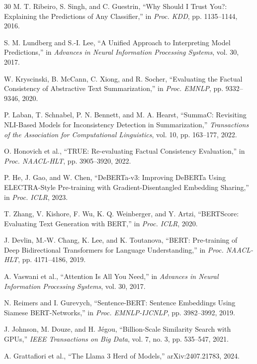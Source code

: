 \documentclass[conference]{IEEEtran}
\begin{document}
\begin{thebibliography}{30}
M. T. Ribeiro, S. Singh, and C. Guestrin, ``Why Should I Trust You?: Explaining the Predictions of Any Classifier,'' in \emph{Proc. KDD}, pp. 1135--1144, 2016.

S. M. Lundberg and S.-I. Lee, ``A Unified Approach to Interpreting Model Predictions,'' in \emph{Advances in Neural Information Processing Systems}, vol. 30, 2017.

W. Kryscinski, B. McCann, C. Xiong, and R. Socher, ``Evaluating the Factual Consistency of Abstractive Text Summarization,'' in \emph{Proc. EMNLP}, pp. 9332--9346, 2020.

P. Laban, T. Schnabel, P. N. Bennett, and M. A. Hearst, ``SummaC: Revisiting NLI-Based Models for Inconsistency Detection in Summarization,'' \emph{Transactions of the Association for Computational Linguistics}, vol. 10, pp. 163--177, 2022.

O. Honovich et al., ``TRUE: Re-evaluating Factual Consistency Evaluation,'' in \emph{Proc. NAACL-HLT}, pp. 3905--3920, 2022.

P. He, J. Gao, and W. Chen, ``DeBERTa-v3: Improving DeBERTa Using ELECTRA-Style Pre-training with Gradient-Disentangled Embedding Sharing,'' in \emph{Proc. ICLR}, 2023.

T. Zhang, V. Kishore, F. Wu, K. Q. Weinberger, and Y. Artzi, ``BERTScore: Evaluating Text Generation with BERT,'' in \emph{Proc. ICLR}, 2020.

J. Devlin, M.-W. Chang, K. Lee, and K. Toutanova, ``BERT: Pre-training of Deep Bidirectional Transformers for Language Understanding,'' in \emph{Proc. NAACL-HLT}, pp. 4171--4186, 2019.

A. Vaswani et al., ``Attention Is All You Need,'' in \emph{Advances in Neural Information Processing Systems}, vol. 30, 2017.

N. Reimers and I. Gurevych, ``Sentence-BERT: Sentence Embeddings Using Siamese BERT-Networks,'' in \emph{Proc. EMNLP-IJCNLP}, pp. 3982--3992, 2019.

J. Johnson, M. Douze, and H. Jégou, ``Billion-Scale Similarity Search with GPUs,'' \emph{IEEE Transactions on Big Data}, vol. 7, no. 3, pp. 535--547, 2021.

A. Grattafiori et al., ``The Llama 3 Herd of Models,'' arXiv:2407.21783, 2024.


\end{thebibliography}
\end{document}
